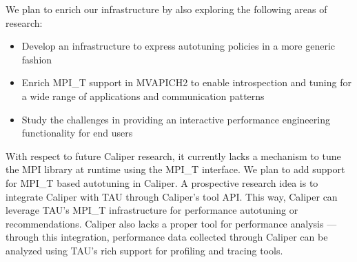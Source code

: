 \par We plan to enrich our infrastructure by also exploring the following areas of research:
\begin{itemize}
	\item Develop an infrastructure to express autotuning policies in a more generic fashion
        \item Enrich MPI\_T support in MVAPICH2 to enable introspection and tuning for a wide range of applications and communication patterns
	\item Study the challenges in providing an interactive performance engineering functionality for end users
\end{itemize}

\par With respect to future Caliper research, it currently lacks a mechanism to tune the MPI library at runtime using the MPI\_T interface. We plan to add support for MPI\_T based autotuning in Caliper. A prospective research idea is to integrate Caliper with TAU through Caliper's tool API. This way, Caliper can leverage TAU's MPI\_T infrastructure for performance autotuning or recommendations. Caliper also lacks a proper tool for performance analysis --- through this integration, performance data collected through Caliper can be analyzed using TAU's rich support for profiling and tracing tools.

